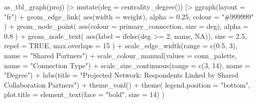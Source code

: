 \documentclass[
  letterpaper,
  DIV=11,
  numbers=noendperiod]{scrartcl}
\newenvironment{Shaded}{\begin{snugshade}}{\end{snugshade}}
\newcommand{\AttributeTok}[1]{\textcolor[rgb]{0.40,0.45,0.13}{#1}}
\newcommand{\ConstantTok}[1]{\textcolor[rgb]{0.56,0.35,0.01}{#1}}
\newcommand{\DecValTok}[1]{\textcolor[rgb]{0.68,0.00,0.00}{#1}}
\newcommand{\FloatTok}[1]{\textcolor[rgb]{0.68,0.00,0.00}{#1}}
\newcommand{\FunctionTok}[1]{\textcolor[rgb]{0.28,0.35,0.67}{#1}}
\newcommand{\NormalTok}[1]{\textcolor[rgb]{0.00,0.23,0.31}{#1}}
\newcommand{\SpecialCharTok}[1]{\textcolor[rgb]{0.37,0.37,0.37}{#1}}
\newcommand{\StringTok}[1]{\textcolor[rgb]{0.13,0.47,0.30}{#1}}
\begin{document}
\begin{Shaded}
\begin{Highlighting}[]
\FunctionTok{as\_tbl\_graph}\NormalTok{(proj) }\SpecialCharTok{|\textgreater{}}
  \FunctionTok{mutate}\NormalTok{(}\AttributeTok{deg =} \FunctionTok{centrality\_degree}\NormalTok{()) }\SpecialCharTok{|\textgreater{}}
  \FunctionTok{ggraph}\NormalTok{(}\AttributeTok{layout =} \StringTok{"fr"}\NormalTok{) }\SpecialCharTok{+}
  \FunctionTok{geom\_edge\_link}\NormalTok{(}
    \FunctionTok{aes}\NormalTok{(}\AttributeTok{width =}\NormalTok{ weight),}
    \AttributeTok{alpha =} \FloatTok{0.25}\NormalTok{, }\AttributeTok{colour =} \StringTok{"\#999999"}
\NormalTok{  ) }\SpecialCharTok{+}
  \FunctionTok{geom\_node\_point}\NormalTok{(}
    \FunctionTok{aes}\NormalTok{(}\AttributeTok{colour =}\NormalTok{ primary\_connection, }\AttributeTok{size =}\NormalTok{ deg),}
    \AttributeTok{alpha =} \FloatTok{0.8}
\NormalTok{  ) }\SpecialCharTok{+}
  \FunctionTok{geom\_node\_text}\NormalTok{(}
    \FunctionTok{aes}\NormalTok{(}\AttributeTok{label =} \FunctionTok{ifelse}\NormalTok{(deg }\SpecialCharTok{\textgreater{}=} \DecValTok{2}\NormalTok{, name, }\ConstantTok{NA}\NormalTok{)),}
    \AttributeTok{size =} \FloatTok{2.5}\NormalTok{, }\AttributeTok{repel =} \ConstantTok{TRUE}\NormalTok{, }\AttributeTok{max.overlaps =} \DecValTok{15}
\NormalTok{  ) }\SpecialCharTok{+}
  \FunctionTok{scale\_edge\_width}\NormalTok{(}\AttributeTok{range =} \FunctionTok{c}\NormalTok{(}\FloatTok{0.5}\NormalTok{, }\DecValTok{3}\NormalTok{), }\AttributeTok{name =} \StringTok{"Shared Partners"}\NormalTok{) }\SpecialCharTok{+}
  \FunctionTok{scale\_colour\_manual}\NormalTok{(}\AttributeTok{values =}\NormalTok{ conn\_palette, }\AttributeTok{name =} \StringTok{"Connection Type"}\NormalTok{) }\SpecialCharTok{+}
  \FunctionTok{scale\_size\_continuous}\NormalTok{(}\AttributeTok{range =} \FunctionTok{c}\NormalTok{(}\DecValTok{3}\NormalTok{, }\DecValTok{14}\NormalTok{), }\AttributeTok{name =} \StringTok{"Degree"}\NormalTok{) }\SpecialCharTok{+}
  \FunctionTok{labs}\NormalTok{(}\AttributeTok{title =} \StringTok{"Projected Network: Respondents Linked by Shared Collaboration Partners"}\NormalTok{) }\SpecialCharTok{+}
  \FunctionTok{theme\_void}\NormalTok{() }\SpecialCharTok{+}
  \FunctionTok{theme}\NormalTok{(}
    \AttributeTok{legend.position =} \StringTok{"bottom"}\NormalTok{,}
    \AttributeTok{plot.title =} \FunctionTok{element\_text}\NormalTok{(}\AttributeTok{face =} \StringTok{"bold"}\NormalTok{, }\AttributeTok{size =} \DecValTok{14}\NormalTok{)}
\NormalTok{  )}
\end{Highlighting}
\end{Shaded}
\end{document}
